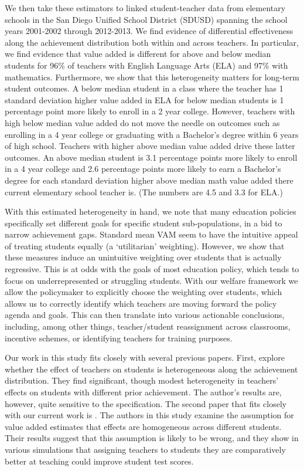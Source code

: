 \documentclass[letterpaper,12pt]{article}
\begin{document}
We then take these estimators to linked student-teacher data from elementary schools in the San Diego Unified School District (SDUSD) spanning the school years 2001-2002 through 2012-2013. We find evidence of differential effectiveness along the achievement distribution both within and across teachers. In particular, we find evidence that value added is different for above and below median students for 96\% of teachers with English Language Arts (ELA) and 97\% with mathematics. Furthermore, we show that this heterogeneity matters for long-term student outcomes. A below median student in a class where the teacher has 1 standard deviation higher value added in ELA for below median students is 1 percentage point more likely to enroll in a 2 year college. However, teachers with high below median value added do not move the needle on outcomes such as enrolling in a 4 year college or graduating with a Bachelor's degree within 6 years of high school. Teachers with higher above median value added drive these latter outcomes. An above median student is 3.1 percentage points more likely to enroll in a 4 year college and 2.6 percentage points more likely to earn a Bachelor's degree for each standard deviation higher above median math value added there current elementary school teacher is. (The numbers are 4.5 and 3.3 for ELA.)

With this estimated heterogeneity in hand, we note that many education policies specifically set different goals for specific student sub-populations, in a bid to narrow achievement gaps. Standard mean VAM seem to have the intuitive appeal of treating students equally (a `utilitarian' weighting). However, we show that these measures induce an unintuitive weighting over students that is actually regressive. This is at odds with the goals of most education policy, which tends to focus on underrepresented or struggling students. With our welfare framework we allow the policymaker to explicitly choose the weighting over students, which allows us to correctly identify which teachers are moving forward the policy agenda and goals. This can then translate into various actionable conclusions, including, among other things, teacher/student reassignment across classrooms, incentive schemes, or identifying teachers for training purposes.

Our work in this study fits closely with several previous papers. First, \citet{lockwood2009} explore whether the effect of teachers on students is heterogeneous along the achievement distribution. They find significant, though modest heterogeneity in teachers' effects on students with different prior achievement. The author's results are, however, quite sensitive to the specification. The second paper that fits closely with our current work is \citet{condie2014teacher}. The authors in this study examine the assumption for value added estimates that effects are homogeneous across different students. Their results suggest that this assumption is likely to be wrong, and they show in various simulations that assigning teachers to students they are comparatively better at teaching could improve student test scores.
\end{document}

